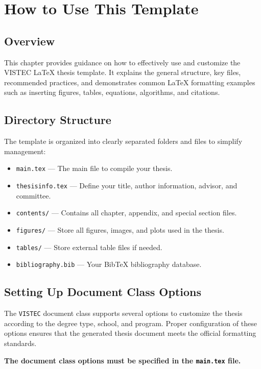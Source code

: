 \chapter{How to Use This Template}
\label{chapter3}

\section{Overview}
\begin{paragraph}
This chapter provides guidance on how to effectively use and customize the VISTEC {\LaTeX} thesis template. It explains the general structure, key files, recommended practices, and demonstrates common {\LaTeX} formatting examples such as inserting figures, tables, equations, algorithms, and citations.
\end{paragraph}

\section{Directory Structure}
\begin{paragraph}
The template is organized into clearly separated folders and files to simplify management:

\begin{itemize}[leftmargin=\paritemindent]
    \item \texttt{main.tex} — The main file to compile your thesis.
    \item \texttt{thesisinfo.tex} — Define your title, author information, advisor, and committee.
    \item \texttt{contents/} — Contains all chapter, appendix, and special section files.
    \item \texttt{figures/} — Store all figures, images, and plots used in the thesis.
    \item \texttt{tables/} — Store external table files if needed.
    \item \texttt{bibliography.bib} — Your BibTeX bibliography database.
\end{itemize}
\end{paragraph}

\section{Setting Up Document Class Options}
\begin{paragraph}
The \texttt{VISTEC} document class supports several options to customize the thesis according to the degree type, school, and program. Proper configuration of these options ensures that the generated thesis document meets the official formatting standards. 

\textbf{The document class options must be specified in the \texttt{main.tex} file.}
\end{paragraph}

